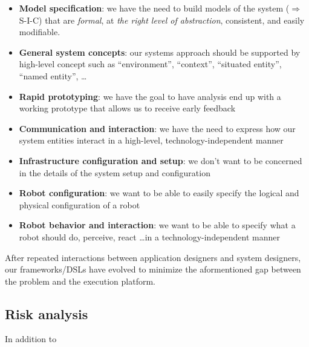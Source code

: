\documentclass[11pt]{article}
\begin{document}
\begin{itemize}
  \item \textbf{Model specification}: we have the need to build models of the
  system ($\Rightarrow$ S-I-C) that are \emph{formal}, at \emph{the
  right level of abstraction}, consistent, and easily modifiable.
  
  \item \textbf{General system concepts}: our systems approach should be
  supported by high-level concept such as ``environment'', ``context'', ``situated entity'',
  ``named entity'', \ldots 

  \item \textbf{Rapid prototyping}: we have the goal to have analysis end up
  with a working prototype that allows us to receive early feedback
  
  \item \textbf{Communication and interaction}: we have the need to express how
  our system entities interact in a high-level, technology-independent manner
  
  \item \textbf{Infrastructure configuration and setup}: we don't want to be
  concerned in the details of the system setup and configuration
  
  \item \textbf{Robot configuration}: we want to
  be able to easily specify the logical and physical configuration of a 
  robot  

  \item \textbf{Robot behavior and interaction}: we want to be able to specify
  	what a robot should do, perceive, react \ldots in a technology-independent manner

\end{itemize}

  After repeated interactions between application designers and system
  designers, our frameworks/DSLs have evolved to minimize the aformentioned gap
  between the problem and the execution platform.
 
 

\subsection{Risk analysis}



 In addition to
 
\end{document}
